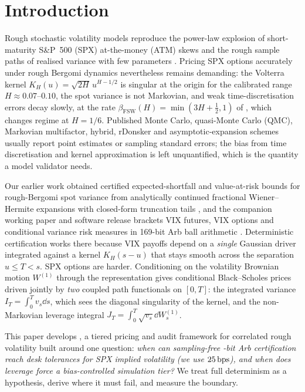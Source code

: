 \section{Introduction}
\label{sec:intro}

Rough stochastic volatility models reproduce the power-law explosion of short-maturity S\&P~500 (SPX) at-the-money (ATM) skews and the rough sample paths of realised variance with few parameters \citep{GatheralJaissonRosenbaum2018,BayerFrizGatheral2016}. Pricing SPX options accurately under rough Bergomi dynamics nevertheless remains demanding: the Volterra kernel $K_H(u)=\sqrt{2H}\,u^{H-1/2}$ is singular at the origin for the calibrated range $H\approx 0.07$--$0.10$, the spot variance is not Markovian, and weak time-discretisation errors decay slowly, at the rate $\beta_{\mathrm{FSW}}(H)=\min(3H+\tfrac12,1)$ of \citet{FrizSalkeldWagenhofer2025}, which changes regime at $H=1/6$. Published Monte Carlo, quasi-Monte Carlo (QMC), Markovian multifactor, hybrid, rDonsker and asymptotic-expansion schemes usually report point estimates or sampling standard errors; the bias from time discretisation and kernel approximation is left unquantified, which is the quantity a model validator needs.

Our earlier work obtained certified expected-shortfall and value-at-risk bounds for rough-Bergomi spot variance from analytically continued fractional Wiener--Hermite expansions with closed-form truncation tails \citep{AHMED2026111045}, and the companion working paper and software release \RoughCert{} \citep{AhmedEtAl2026RoughCert} brackets VIX futures, VIX options and conditional variance risk measures in 169-bit Arb ball arithmetic \citep{MooreKearfottCloud2009,Johansson2017}. Deterministic certification works there because VIX payoffs depend on a \emph{single} Gaussian driver integrated against a kernel $K_H(s-u)$ that stays smooth across the separation $u\le T<s$. SPX options are harder. Conditioning on the volatility Brownian motion $W^{(1)}$ through the \citet{RomanoTouzi1997} representation gives conditional Black--Scholes prices driven jointly by \emph{two} coupled path functionals on $[0,T]$: the integrated variance $I_T=\int_0^T v_s\dd s$, which sees the diagonal singularity of the kernel, and the non-Markovian leverage integral $J_T=\int_0^T\sqrt{v_s}\dd W_s^{(1)}$.

This paper develops \RoughCertSPX{}, a tiered pricing and audit framework for correlated rough volatility built around one question: \emph{when can sampling-free \ArbBits-bit Arb certification reach desk tolerances for SPX implied volatility (we use $25\,\mathrm{bps}$), and when does leverage force a bias-controlled simulation tier?} We treat full determinism as a hypothesis, derive where it must fail, and measure the boundary.

